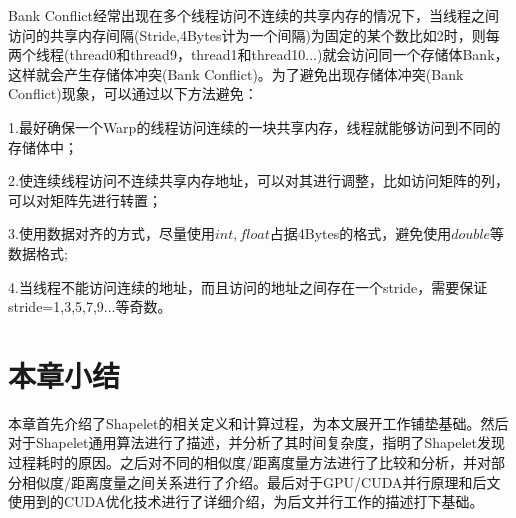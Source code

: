 Bank Conflict经常出现在多个线程访问不连续的共享内存的情况下，当线程之间访问的共享内存间隔(Stride,4Bytes计为一个间隔)为固定的某个数比如2时，则每两个线程(thread0和thread9，thread1和thread10...)就会访问同一个存储体Bank，这样就会产生存储体冲突(Bank Conflict)。为了避免出现存储体冲突(Bank Conflict)现象，可以通过以下方法避免：

1.最好确保一个Warp的线程访问连续的一块共享内存，线程就能够访问到不同的存储体中；

2.使连续线程访问不连续共享内存地址，可以对其进行调整，比如访问矩阵的列，可以对矩阵先进行转置；

3.使用数据对齐的方式，尽量使用$int,float$占据4Bytes的格式，避免使用$double$等数据格式;

4.当线程不能访问连续的地址，而且访问的地址之间存在一个stride，需要保证stride=1,3,5,7,9...等奇数。


\section{本章小结}

本章首先介绍了Shapelet的相关定义和计算过程，为本文展开工作铺垫基础。然后对于Shapelet通用算法进行了描述，并分析了其时间复杂度，指明了Shapelet发现过程耗时的原因。之后对不同的相似度/距离度量方法进行了比较和分析，并对部分相似度/距离度量之间关系进行了介绍。最后对于GPU/CUDA并行原理和后文使用到的CUDA优化技术进行了详细介绍，为后文并行工作的描述打下基础。


